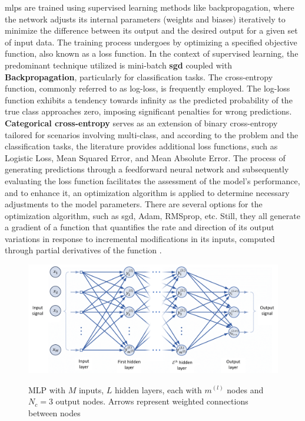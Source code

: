 \gls{mlp}s are trained using supervised learning methods like backpropagation, where the network adjusts its internal parameters (weights and biases) iteratively to minimize the difference between its output and the desired output for a given set of input data. The training process undergoes by optimizing a specified objective function, also known as a loss function. In the context of supervised learning, the predominant technique utilized is mini-batch \textbf{\gls{sgd}} coupled with \textbf{Backpropagation}, particularly for classification tasks. The cross-entropy function, commonly referred to as log-loss, is frequently employed. The log-loss function exhibits a tendency towards infinity as the predicted probability of the true class approaches zero, imposing significant penalties for wrong predictions. \textbf{Categorical cross-entropy} serves as an extension of binary cross-entropy tailored for scenarios involving multi-class, and according to the problem and the classification tasks, the literature provides additional loss functions, such as Logistic Loss, Mean Squared Error, and Mean Absolute Error. The process of generating predictions through a feedforward neural network and subsequently evaluating the loss function facilitates the assessment of the model's performance, and to enhance it, an optimization algorithm is applied to determine necessary adjustments to the model parameters. There are several options for the optimization algorithm, such as \gls{sgd}, Adam, RMSprop, etc. Still, they all generate a gradient of a function that quantifies the rate and direction of its output variations in response to incremental modifications in its inputs, computed through partial derivatives of the function \cite{Bishop2023}. 

\begin{figure}[htbp]
    \raggedright
        \caption{MLP with $M$ inputs, $L$ hidden layers, each with $m^{(l)}$ nodes and $N_c = 3$ output nodes. Arrows represent weighted connections between nodes}
        \includegraphics[width=1\textwidth]{resources/images/030-theoretical_framework/Framework_ann_mlp.png}
        \label{fig:frmwk_ann_mlp}
\end{figure}

